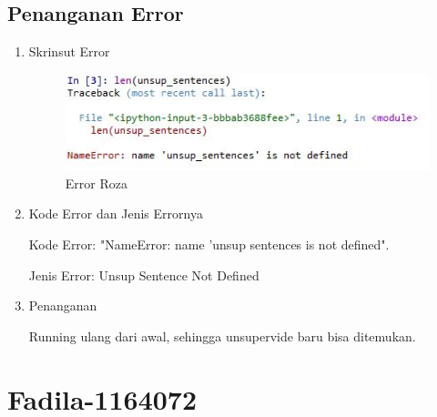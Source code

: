 \begin{enumerate}
\subsection{Penanganan Error}
\begin{enumerate}
\item Skrinsut Error
\begin{figure}[ht]
\centering
\includegraphics[scale=0.5]{figures/errorrozaaa.jpg}
\caption{ Error Roza}
\label{6}
\end{figure}
\item Kode Error dan Jenis Errornya
\par Kode Error: "NameError: name 'unsup sentences is not defined". 
\par Jenis Error: Unsup Sentence Not Defined
\item Penanganan
\par Running ulang dari awal, sehingga unsupervide baru bisa ditemukan.


\end{enumerate}
\end{enumerate}

\par
\par
\par
\par
\par
\section{Fadila-1164072}
